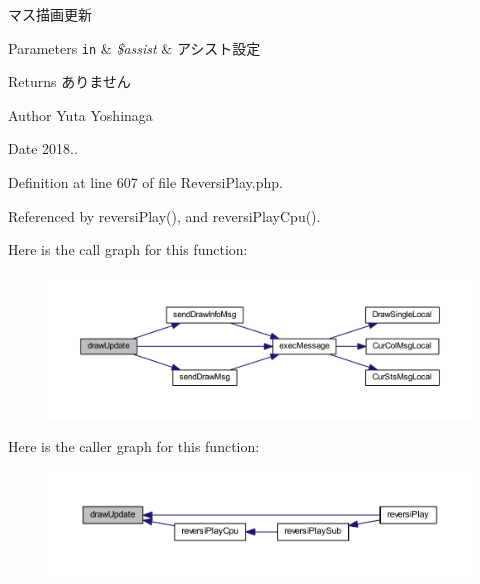 マス描画更新 


\begin{DoxyParams}[1]{Parameters}
\mbox{\tt in}  & {\em \$assist} & アシスト設定 \\
\hline
\end{DoxyParams}
\begin{DoxyReturn}{Returns}
ありません 
\end{DoxyReturn}
\begin{DoxyAuthor}{Author}
Yuta Yoshinaga 
\end{DoxyAuthor}
\begin{DoxyDate}{Date}
2018.. 
\end{DoxyDate}


Definition at line 607 of file Reversi\+Play.\+php.



Referenced by reversi\+Play(), and reversi\+Play\+Cpu().



Here is the call graph for this function\+:
\nopagebreak
\begin{figure}[H]
\begin{center}
\leavevmode
\includegraphics[width=350pt]{class_reversi_play_a52029e5f2e049767d1f67c3f5c18ce9f_cgraph}
\end{center}
\end{figure}




Here is the caller graph for this function\+:
\nopagebreak
\begin{figure}[H]
\begin{center}
\leavevmode
\includegraphics[width=350pt]{class_reversi_play_a52029e5f2e049767d1f67c3f5c18ce9f_icgraph}
\end{center}
\end{figure}


